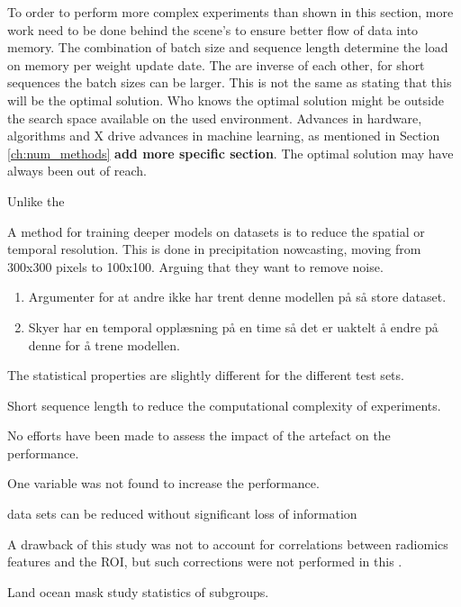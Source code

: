 To order to perform more complex experiments than shown in this section, more work need to be done behind the scene's to ensure better flow of data into memory. The combination of batch size and sequence length determine the load on memory per weight update date. The are inverse of each other, for short sequences the batch sizes can be larger. This is not the same as stating that this will be the optimal solution. Who knows the optimal solution might be outside the search space available on the used environment. Advances in hardware, algorithms and X drive advances in machine learning, as mentioned in Section \ref{ch:num_methods} \textbf{add more specific section}. The optimal solution may have always been out of reach. 

Unlike the \cite{}

A method for training deeper models on datasets is to reduce the spatial or temporal resolution. This is done in precipitation nowcasting, moving from 300x300 pixels to 100x100. Arguing that they want to remove noise.

\begin{enumerate}
    \item Argumenter for at andre ikke har trent denne modellen på så store dataset. 
    \item Skyer har en temporal opplæsning på en time så det er uaktelt å endre på denne for å trene modellen. 
\end{enumerate}


The statistical properties are slightly different for the different test sets.  

Short sequence length to reduce the computational complexity of experiments. 

No efforts have been made to assess the impact of the artefact on the performance.

One variable was not found to increase the performance.


data sets can be reduced without significant loss of information

A drawback of this study was not to account for correlations between radiomics features and the ROI, but such corrections were
not performed in this .

Land ocean mask study statistics of subgroups.
